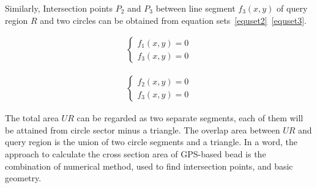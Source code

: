 Similarly, Intersection points $P_2$ and $P_3$ between line segment $f_3(x, y)$
of query region $R$ and two circles can be obtained from equation sets~\ref{equset2}~\ref{equset3}.

\begin{align}
\begin{cases}
f_1(x, y)=0\\
f_3(x, y)=0
\label{equset2}
\end{cases}
\end{align}

\begin{align}
\begin{cases}
f_2(x, y)=0\\
f_3(x, y)=0
\label{equset3}
\end{cases}
\end{align}

The total area $UR$ can be regarded as two separate segments, each of them will be attained
from circle sector minus a triangle. The overlap area between $UR$ and query region is the
union of two circle segments and a triangle. In a word, the approach to calculate the cross section area of GPS-based bead is the combination of 
numerical method, used to find intersection points, and basic geometry.

